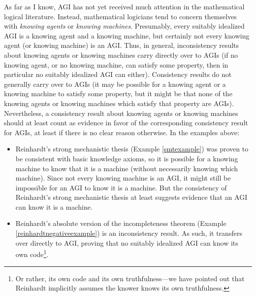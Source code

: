 \documentclass[runningheads]{llncs}
\begin{document}
\begin{remark}
  As far as I know, AGI has not yet received much attention in the mathematical logical
  literature. Instead, mathematical logicians tend to concern themselves with
  \emph{knowing agents} or \emph{knowing machines}. Presumably, every
  suitably idealized AGI is a
  knowing agent and a knowing machine, but certainly not every
  knowing agent (or knowing machine) is an AGI. Thus, in general,
  inconsistency results about knowing agents or knowing machines
  carry directly over to AGIs (if no knowing agent, or no knowing machine, can
  satisfy some property, then in particular no suitably idealized AGI can either).
  Consistency results do not generally carry over to AGIs (it may be possible for
  a knowing agent or a knowing machine to satisfy some property, but it might be
  that none of the knowing agents or knowing machines which satisfy that property
  are AGIs). Nevertheless, a consistency result about knowing agents or knowing machines
  should at least count as evidence in favor of the corresponding consistency result
  for AGIs, at least if there is no clear reason otherwise. In the examples above:
  \begin{itemize}
    \item
    Reinhardt's strong mechanistic thesis (Example \ref{smtexample})
    was proven to be consistent with basic knowledge axioms, so it is possible
    for a knowing machine to
    know that it is a machine (without necessarily knowing which machine).
    Since not every knowing machine is an AGI, it might still be impossible
    for an AGI to know it is a machine. But the consistency of Reinhardt's
    strong mechanistic thesis at least suggests evidence that an AGI can
    know it is a machine.
    \item
    Reinhardt's absolute version of the incompleteness theorem
    (Example \ref{reinhardtnegativeexample}) is an inconsistency result.
    As such, it transfers over directly to AGI, proving that no suitably idealized
    AGI can know its own code\footnote{Or rather,
    its own code and its
    own truthfulness---we have pointed out \cite{alexander2014machine} that
    Reinhardt implicitly
    assumes the knower knows its own truthfulness.}.
  \end{itemize}
\end{remark}
\end{document}
